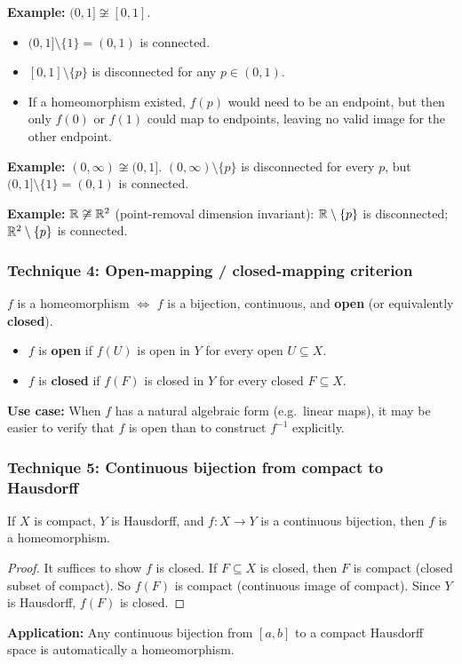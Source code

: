 \documentclass{article}
\begin{document}
\textbf{Example:} $(0,1] \not\cong [0,1]$.
\begin{itemize}
  \item $(0,1] \setminus \{1\} = (0,1)$ is connected.
  \item $[0,1] \setminus \{p\}$ is disconnected for any $p \in (0,1)$.
  \item If a homeomorphism existed, $f(p)$ would need to be an endpoint,
    but then only $f(0)$ or $f(1)$ could map to endpoints, leaving no
    valid image for the other endpoint.
\end{itemize}

\textbf{Example:} $(0,\infty) \not\cong (0,1]$.
$(0,\infty) \setminus \{p\}$ is disconnected for every $p$, but
$(0,1] \setminus \{1\} = (0,1)$ is connected.

\textbf{Example:} $\mathbb{R} \not\cong \mathbb{R}^2$ (point-removal dimension
invariant): $\mathbb{R} \setminus \{p\}$ is disconnected; $\mathbb{R}^2 \setminus \{p\}$
is connected.

\subsubsection*{Technique 4: Open-mapping / closed-mapping criterion}
$f$ is a homeomorphism $\iff$ $f$ is a bijection, continuous, and
\textbf{open} (or equivalently \textbf{closed}).
\begin{itemize}
  \item $f$ is \textbf{open} if $f(U)$ is open in $Y$ for every open
    $U \subseteq X$.
  \item $f$ is \textbf{closed} if $f(F)$ is closed in $Y$ for every
    closed $F \subseteq X$.
\end{itemize}
\textbf{Use case:} When $f$ has a natural algebraic form (e.g.\ linear
maps), it may be easier to verify that $f$ is open than to construct
$f^{-1}$ explicitly.

\subsubsection*{Technique 5: Continuous bijection from compact to Hausdorff}
\begin{theorem}
  If $X$ is compact, $Y$ is Hausdorff, and $f : X \to Y$ is a
  continuous bijection, then $f$ is a homeomorphism.
\end{theorem}
\begin{proof}
  It suffices to show $f$ is closed. If $F \subseteq X$ is closed, then
  $F$ is compact (closed subset of compact). So $f(F)$ is compact
  (continuous image of compact). Since $Y$ is Hausdorff, $f(F)$ is
  closed.
\end{proof}
\textbf{Application:} Any continuous bijection from $[a,b]$ to a compact
Hausdorff space is automatically a homeomorphism.
\end{document}
